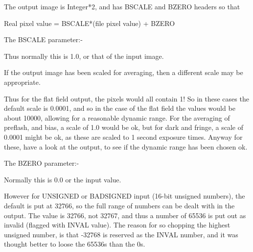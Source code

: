 \begin{small}
{{{   The output image is Integer*2, and has BSCALE and BZERO headers so
   that

       Real pixel value = BSCALE*(file pixel value)  + BZERO

   The BSCALE parameter:-

   Thus normally this is 1.0, or that of the input image.

   If the output image has been scaled for averaging, then a
   different scale may be appropriate.

   Thus for the flat field output, the pixels would all contain 1!
   So in these cases the default scale is 0.0001, and so in the case
   of the flat field the values would be about 10000, allowing for a
   reasonable dynamic range. For the averaging of preflash, and bias,
   a scale of 1.0 would be ok, but for dark and fringe, a scale of
   0.0001 might be ok, as these are scaled to 1 second exposure times.
   Anyway for these, have a look at the output, to see if the dynamic
   range has been chosen ok.

   The BZERO parameter:-

   Normally this is 0.0 or the input value.

   However for UNSIGNED or BADSIGNED input (16-bit unsigned numbers),
   the default is put at 32766, so the full range of numbers can be
   dealt with in the output. The value is 32766, not 32767, and thus
   a number of 65536 is put out as invalid (flagged with INVAL value).
   The reason for so chopping the highest unsigned number, is that
   -32768 is reserved as the INVAL number, and it was thought better
   to loose the 65536s than the 0s.

}}}

\end{small}


\newpage
